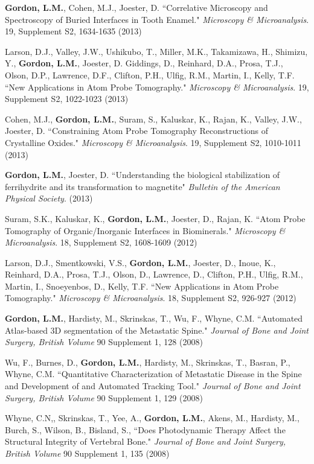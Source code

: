 \textbf{Gordon, L.M.}, Cohen, M.J., Joester, D. ``Correlative Microscopy and Spectroscopy of Buried Interfaces in Tooth Enamel." \emph{Microscopy \& Microanalysis}. 19, Supplement S2, 1634-1635 (2013)

Larson, D.J., Valley, J.W., Ushikubo, T., Miller, M.K., Takamizawa, H., Shimizu, Y., \textbf{Gordon, L.M.}, Joester, D. Giddings, D., Reinhard, D.A., Prosa, T.J., Olson, D.P., Lawrence, D.F., Clifton, P.H., Ulfig, R.M., Martin, I., Kelly, T.F. ``New Applications in Atom Probe Tomography." \emph{Microscopy \& Microanalysis}. 19, Supplement S2, 1022-1023 (2013)

Cohen, M.J., \textbf{Gordon, L.M.}, Suram, S., Kaluskar, K., Rajan, K., Valley, J.W., Joester, D. ``Constraining Atom Probe Tomography Reconstructions of Crystalline Oxides." \emph{Microscopy \& Microanalysis}. 19, Supplement S2, 1010-1011 (2013)

\textbf{Gordon, L.M.}, Joester, D. ``Understanding the biological stabilization of ferrihydrite and its transformation to magnetite" \emph{Bulletin of the American Physical Society}. (2013)

Suram, S.K., Kaluskar, K., \textbf{Gordon, L.M.}, Joester, D., Rajan, K. ``Atom Probe Tomography of Organic/Inorganic Interfaces in Biominerals." \emph{Microscopy \& Microanalysis}. 18, Supplement S2, 1608-1609 (2012)

Larson, D.J., Smentkowski, V.S., \textbf{Gordon, L.M.}, Joester, D., Inoue, K.,  Reinhard, D.A., Prosa, T.J., Olson, D., Lawrence, D., Clifton, P.H., Ulfig, R.M., Martin, I., Snoeyenbos, D., Kelly, T.F. ``New Applications in Atom Probe Tomography." \emph{Microscopy \& Microanalysis}. 18, Supplement S2, 926-927 (2012)

\textbf{Gordon, L.M.}, Hardisty, M., Skrinskas, T., Wu, F., Whyne, C.M. ``Automated Atlas-based 3D segmentation of the Metastatic Spine." \emph{Journal of Bone and Joint Surgery, British Volume} 90 Supplement 1, 128 (2008)

Wu, F., Burnes, D., \textbf{Gordon, L.M.}, Hardisty, M., Skrinskas, T., Basran, P., Whyne, C.M. ``Quantitative Characterization of Metastatic Disease in the Spine and Development of and Automated Tracking Tool."  \emph{Journal of Bone and Joint Surgery, British Volume} 90 Supplement 1, 129 (2008)

Whyne, C.N,, Skrinskas, T., Yee, A., \textbf{Gordon, L.M.}, Akens, M., Hardisty, M., Burch, S., Wilson, B., Bisland, S., ``Does Photodynamic Therapy Affect the Structural Integrity of Vertebral Bone." \emph{Journal of Bone and Joint Surgery, British Volume} 90 Supplement 1, 135 (2008)

